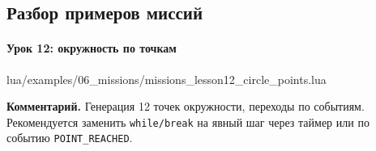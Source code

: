 \subsection{Разбор примеров миссий}
\paragraph{Урок 12: окружность по точкам}
\begin{codefile}{lua/examples/06_missions/missions_lesson12_circle_points.lua}
\end{codefile}
\textbf{Комментарий.} Генерация 12 точек окружности, переходы по событиям. Рекомендуется заменить \texttt{while/break} на явный шаг через таймер или по событию \texttt{POINT\_REACHED}.
